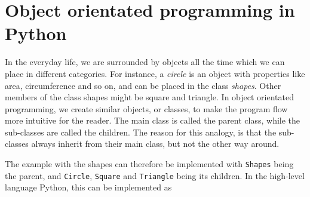 \section{Object orientated programming in Python}
In the everyday life, we are surrounded by objects all the time which we can place in different categories. For instance, a \textit{circle} is an object with properties like area, circumference and so on, and can be placed in the class \textit{shapes}. Other members of the class shapes might be square and triangle. In object orientated programming, we create similar objects, or classes, to make the program flow more intuitive for the reader. The main class is called the parent class, while the sub-classes are called the children. The reason for this analogy, is that the sub-classes always inherit from their main class, but not the other way around. 

The example with the shapes can therefore be implemented with \texttt{Shapes} being the parent, and \texttt{Circle}, \texttt{Square} and \texttt{Triangle} being its children. In the high-level language Python, this can be implemented as 

